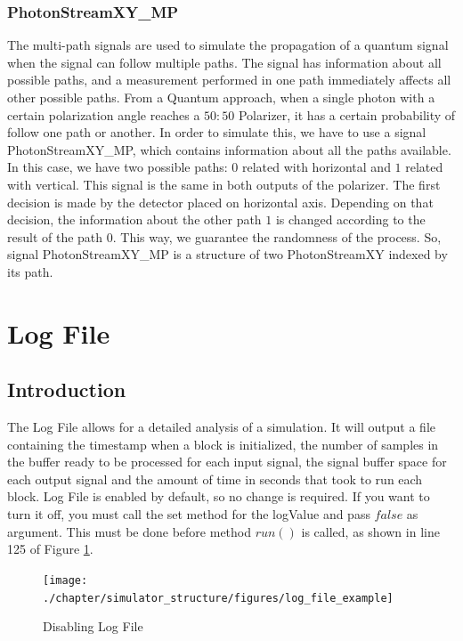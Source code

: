 \begin{refsection}
\subsubsection{PhotonStreamXY\_MP}
The multi-path signals are used to simulate the propagation of a quantum signal when the signal can follow multiple paths. The signal has information about all possible paths, and a measurement performed in one path immediately affects all other possible paths.
From a Quantum approach, when a single photon with a certain polarization angle reaches a $50:50$ Polarizer, it has a certain probability of follow one path or another. In order to simulate this, we have to use a signal PhotonStreamXY\_MP, which contains information about all the paths available. In this case, we have two possible paths: $0$ related with horizontal and $1$ related with vertical. This signal is the same in both outputs of the polarizer. The first decision is made by the detector placed on horizontal axis. Depending on that decision, the information about the other path $1$ is changed according to the result of the path $0$. This way, we guarantee the randomness of the process. So, signal PhotonStreamXY\_MP is a structure of two PhotonStreamXY indexed by its path.


\section{Log File}
\subsection{Introduction}
The Log File allows for a detailed analysis of a simulation. It will output a file containing the timestamp when a block is initialized, the number of samples in the buffer ready to be processed for each input signal, the signal buffer space for each output signal and the amount of time in seconds that took to run each block. Log File is enabled by default, so no change is required. If you want to turn it off, you must call the set method for the logValue and pass $false$ as argument. This must be done before method $run()$ is called, as shown in line 125 of Figure \ref{fig:logfileexample}.

\renewcommand{\figurename}{Figure}
\begin{figure}[H]
\centering
\texttt{[image: ./chapter/simulator\_structure/figures/log\_file\_example]}
\caption{Disabling Log File}
\label{fig:logfileexample}
\end{figure}


\end{refsection}
